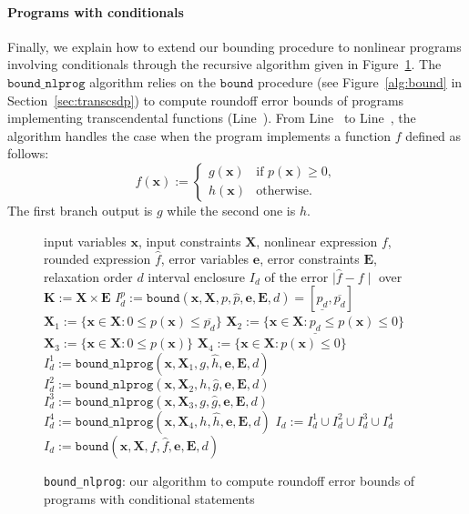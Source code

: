 \documentclass[preprint,fleqn,nocopyrightspace]{sigplanconf}
\newcommand{\code}[1]{\lstinline{#1}}
\newcommand{\x}{\mathbf{x}}
\newcommand{\e}{\mathbf{e}}
\def\E{\mathbf{E}}
\def\K{\mathbf{K}}
\def\X{\mathbf{X}}
\newcommand{\boundfun}[7]{\mathtt{bound}(#1, #2, #3, #4, #5, #6, #7)}
\newcommand{\bound}{\mathtt{bound}}
\newcommand{\boundnlprogfun}[7]{\mathtt{bound\_nlprog}(#1, #2, #3, #4, #5, #6, #7)}
\newcommand{\boundnlprog}{\mathtt{bound\_nlprog}}
\theoremstyle{plain}
\begin{document}
\paragraph{Programs with conditionals}
%
Finally, we explain how to extend our bounding procedure to nonlinear programs involving conditionals through the recursive algorithm given in Figure~\ref{alg:bound_nlprog}.
The $\boundnlprog$ algorithm relies on the $\bound$ procedure (see Figure~\ref{alg:bound} in Section~\ref{sec:transcsdp}) to compute roundoff error bounds of programs implementing transcendental functions (Line~).
From Line~ to Line~, the algorithm handles the case when the program implements a function $f$ defined as follows:
\[   
f (\x) := 
     \begin{cases}
       g(\x) &\text{if } p(\x) \geq 0,\\
       h(\x) &\text{otherwise}.
     \end{cases}
\]
The first branch output is $g$ while the second one is $h$.
%
\begin{figure}[!ht]
\begin{algorithmic}[1]
\Require input variables $\x$, input constraints $\X$, nonlinear expression $f$, rounded expression $\hat{f}$, error variables $\e$, error constraints $\E$, relaxation order $d$
\Ensure interval enclosure $I_d$ of the error $\mid \hat{f} - f  \mid$ over $\K := \X \times \E$
%
 \label{line:cnd}
\State $I_d^p := \boundfun{\x}{\X}{p}{\hat{p}}{\e}{\E}{d} = [\underline{p_d}, \overline{p_d}]$ \label{line:polcnd}
\State $\X_1 := \{ \x \in \X : 0 \leq p(\x) \leq \overline{p_d} \}$ \label{line:X1}
\State $\X_2 := \{ \x \in \X : \underline{p_d} \leq p(\x) \leq 0 \}$\label{line:X2}
\State $\X_3 := \{ \x \in \X : 0 \leq p(\x) \}$\label{line:X3}
\State $\X_4 := \{ \x \in \X : p(\x) \leq 0 \}$\label{line:X4}
\State $I_d^1 := \boundnlprogfun{\x}{\X_1}{g}{\hat{h}}{\e}{\E}{d}$\label{line:I1}
\State $I_d^2 := \boundnlprogfun{\x}{\X_2}{h}{\hat{g}}{\e}{\E}{d}$\label{line:I2}
\State $I_d^3 := \boundnlprogfun{\x}{\X_3}{g}{\hat{g}}{\e}{\E}{d}$\label{line:I3}
\State $I_d^4 := \boundnlprogfun{\x}{\X_4}{h}{\hat{h}}{\e}{\E}{d}$\label{line:I4}
\State \Return $I_d := I_d^1 \cup I_d^2 \cup I_d^3 \cup I_d^4$ \label{line:endcnd}
\Else ~ \Return $I_d := \boundfun{\x}{\X}{f}{\hat{f}}{\e}{\E}{d}$ \label{line:noncnd}
\EndIf
%
\end{algorithmic}
\caption{\code{bound_nlprog}: our algorithm to compute roundoff error bounds of  programs with conditional statements}
\label{alg:bound_nlprog}
\end{figure}
%
\end{document}
